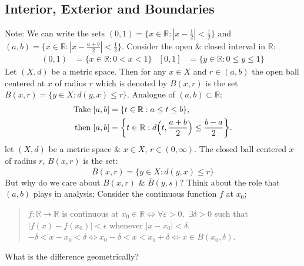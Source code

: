 \documentclass[10pt]{article}
\begin{document}
\subsection{Interior, Exterior and Boundaries}
Note: We can write the sets $(0,1)=\{x\in\mathbb{R}:|x-\frac{1}{2}|<\frac{1}{2}\}$ and $(a,b)=\{x\in\mathbb{R}:|x-\frac{a+b}{2}|<\frac{1}{2}\}$. Consider the open \& closed interval in $\mathbb{R}$: 
\begin{align*}
    (0,1)&=\{x\in\mathbb{R}:0<x<1\} & [0,1]&=\{y\in\mathbb{R}:0\leq y\leq1\}
\end{align*}
Let $(X,d)$ be a metric space. Then for any $x\in X$ and $r\in(a,b)$ the open ball centered at $x$ of radius $r$ which is denoted by $B(x,r)$ is the set $B(x,r)=\{y\in X:d(y,x)\leq r\}$. Analogue of $(a,b)\subset\mathbb{R}$: 
\begin{align*}
    \text{Take }[a,b]&=\{t\in\mathbb{R}:a\leq t\leq b\},\\
    \text{then }[a,b]&=\bigg{\{}t\in\mathbb{R}:d\Big{(}t,\frac{a+b}{2}\Big{)}\leq\frac{b-a}{2}\bigg{\}}.
\end{align*}
let $(X,d)$ be a metric space \& $x\in X$, $r\in(0,\infty)$. The closed ball centered $x$ of radius $r$, $B(x,r)$ is the set: \begin{equation*}\bar{B}(x,r)=\{y\in X:d(y,x)\leq r\}\end{equation*}
But why do we care about $B(x,r)$ \& $\bar{B}(y,s)$? Think about the role that $(a,b)$ plays in analysis; Consider the continuous function $f$ at $x_{0}$;
\begin{quote}
    $f:\mathbb{R}\to\mathbb{R}$ is continuous at $x_{0}\in\mathbb{R}\iff\forall\varepsilon>0,\,\,\exists\delta>0$ such that $|f(x)-f(x_{0})|<\epsilon$ whenever $|x-x_{0}|<\delta$. $-\delta<x-x_{0}<\delta\iff x_{0}-\delta<x<x_{0}+\delta\iff x\in B(x_{0},\delta)$.
\end{quote}
What is the difference geometrically? 
\end{document}
